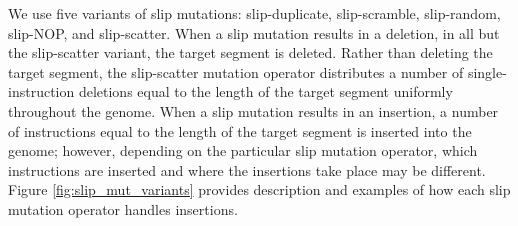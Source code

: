 We use five variants of slip mutations: slip-duplicate, slip-scramble, slip-random, slip-NOP, and slip-scatter. When a slip mutation results in a deletion, in all but the slip-scatter variant, the target segment is deleted. Rather than deleting the target segment, the slip-scatter mutation operator distributes a number of single-instruction deletions equal to the length of the target segment uniformly throughout the genome. When a slip mutation results in an insertion, a number of instructions equal to the length of the target segment is inserted into the genome; however, depending on the particular slip mutation operator, which instructions are inserted and where the insertions take place may be different. Figure \ref{fig:slip_mut_variants} provides description and examples of how each slip mutation operator handles insertions. %

